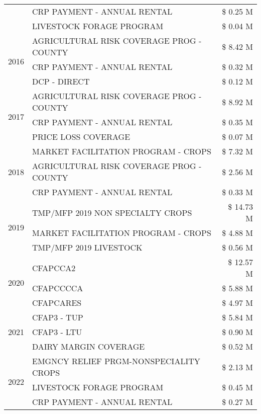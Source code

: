 \begin{tabular}{llr}
 & CRP PAYMENT - ANNUAL RENTAL & \$ 0.25 M \\
 & LIVESTOCK FORAGE PROGRAM & \$ 0.04 M \\
\cline{1-3}
\multirow[t]{3}{*}{2016} & AGRICULTURAL RISK COVERAGE PROG - COUNTY & \$ 8.42 M \\
 & CRP PAYMENT - ANNUAL RENTAL & \$ 0.32 M \\
 & DCP - DIRECT & \$ 0.12 M \\
\cline{1-3}
\multirow[t]{3}{*}{2017} & AGRICULTURAL RISK COVERAGE PROG - COUNTY & \$ 8.92 M \\
 & CRP PAYMENT - ANNUAL RENTAL & \$ 0.35 M \\
 & PRICE LOSS COVERAGE & \$ 0.07 M \\
\cline{1-3}
\multirow[t]{3}{*}{2018} & MARKET FACILITATION PROGRAM - CROPS & \$ 7.32 M \\
 & AGRICULTURAL RISK COVERAGE PROG - COUNTY & \$ 2.56 M \\
 & CRP PAYMENT - ANNUAL RENTAL & \$ 0.33 M \\
\cline{1-3}
\multirow[t]{3}{*}{2019} & TMP/MFP 2019 NON SPECIALTY CROPS & \$ 14.73 M \\
 & MARKET FACILITATION PROGRAM - CROPS & \$ 4.88 M \\
 & TMP/MFP 2019 LIVESTOCK & \$ 0.56 M \\
\cline{1-3}
\multirow[t]{3}{*}{2020} & CFAPCCA2 & \$ 12.57 M \\
 & CFAPCCCCA & \$ 5.88 M \\
 & CFAPCARES & \$ 4.97 M \\
\cline{1-3}
\multirow[t]{3}{*}{2021} & CFAP3 - TUP & \$ 5.84 M \\
 & CFAP3 - LTU & \$ 0.90 M \\
 & DAIRY MARGIN COVERAGE & \$ 0.52 M \\
\cline{1-3}
\multirow[t]{3}{*}{2022} & EMGNCY RELIEF PRGM-NONSPECIALITY CROPS & \$ 2.13 M \\
 & LIVESTOCK FORAGE PROGRAM & \$ 0.45 M \\
 & CRP PAYMENT - ANNUAL RENTAL & \$ 0.27 M \\
\cline{1-3}
\bottomrule
\end{tabular}

